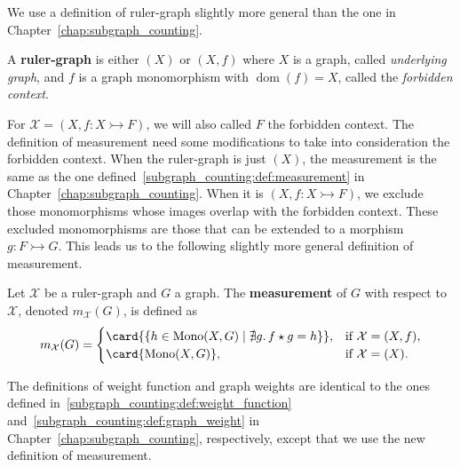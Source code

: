 
We use a definition of ruler-graph slightly more general than the one in Chapter~\ref{chap:subgraph_counting}.

\begin{definition}
    \label{antipattern:def:ruler_graph}
    A \textbf{ruler-graph} is either $(X)$ or \( (X, f) \) where $X$ is a graph, called \emph{underlying graph}, and $f$ is a graph monomorphism with $\operatorname{dom}(f) = X$, called the \emph{forbidden context}.
\end{definition}
For $\mathcal{X} = (X, f:X \rightarrowtail F)$, we will also called $F$ the forbidden context. The definition of measurement need some modifications to take into consideration the forbidden context. When the ruler-graph is just $(X)$, the measurement is the same as the one defined~\autoref{subgraph_counting:def:measurement} in Chapter~\ref{chap:subgraph_counting}. When it is $(X, f:X \rightarrowtail F)$, we exclude those monomorphisms whose images overlap with the forbidden context. These excluded monomorphisms are those that can be extended to a morphism $g: F \rightarrowtail G$. This leads us to the following slightly more general definition of measurement.
\begin{definition}[Measurement]
    \label{antipattern:def:measurement}
    Let \( \mathcal{X}\) be a ruler-graph and \( G \) a graph. The \textbf{measurement} of \( G \) with respect to \( \mathcal{X}\), denoted \( m_\mathcal{X}(G) \), is defined as 
    \[
        m_\mathcal{X}(G) =
        \begin{cases}
            \card{\{h \in \operatorname{Mono}(X,G) \mid \nexists g.\,f \star g = h \}}, & \text{if } \mathcal{X} = (X, f), \\
            \card{\operatorname{Mono}(X,G)}, & \text{if } \mathcal{X} = (X).
        \end{cases}
    \]
\end{definition}
The definitions of weight function and graph weights are identical to the ones defined in~\autoref{subgraph_counting:def:weight_function} and~\autoref{subgraph_counting:def:graph_weight} in Chapter~\ref{chap:subgraph_counting}, respectively, except that we use the new definition of measurement.